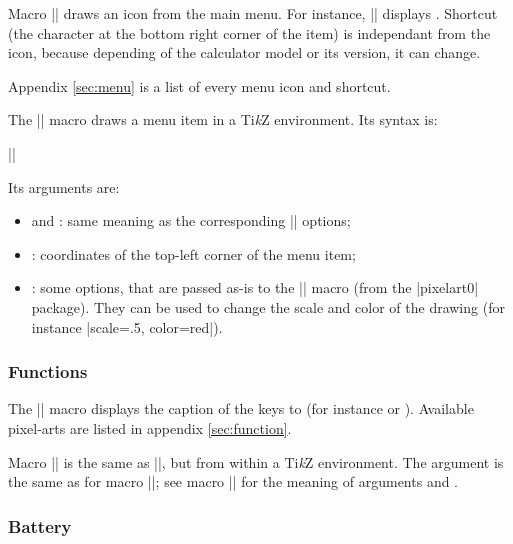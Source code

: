 \documentclass{ltxdoc}
\newcommand{\TikZ}{Ti\emph{k}Z}
\begin{document}
 \DescribeMacro{\menu}
 Macro |\menu| draws an icon from the main menu. For instance, || displays . Shortcut (the character at the bottom right corner of the item) is independant from the icon, because depending of the calculator model or its version, it can change.

 Appendix \ref{sec:menu} is a list of every menu icon and shortcut.

 \DescribeMacro{\tikzmenu}
 The |\tikzmenu| macro draws a menu item in a \TikZ{} environment. Its syntax is:
 \begin{center}
 |\tikzmenu|
 \end{center}
 
 Its arguments are:

 \begin{itemize}
 \item {} and : same meaning as the corresponding |\menu| options;
 \item {}: coordinates of the top-left corner of the menu item;
 \item {}: some options, that are passed as-is to the |\bwpixelart| macro (from the |pixelart0| package). They can be used to change the scale and color of the drawing (for instance |scale=.5, color=red|).
 \end{itemize}

 \subsubsection{Functions}

 \DescribeMacro{\function}
 The |\function| macro displays the caption of the keys  to  (for instance  or ). Available pixel-arts are listed in appendix \ref{sec:function}.

 \DescribeMacro{\tikzfunction}
 Macro |\tikzfunction| is the same as |\function|, but from within a \TikZ{} environment. The  argument is the same as for macro |\function|; see macro |\tikzmenu| for the meaning of arguments  and .

 \subsubsection{Battery}
\end{document}

